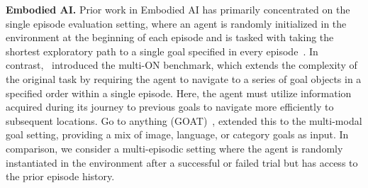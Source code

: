 \textbf{Embodied AI.} 
Prior work in Embodied AI has primarily concentrated on the single episode evaluation setting, where an agent is randomly initialized in the environment at the beginning of each episode and is tasked with taking the shortest exploratory path to a single goal specified in every episode~\citep{wijmans2019dd,yadav2022ovrl}. In contrast,~\cite{wani2020multion} introduced the multi-ON benchmark, which extends the complexity of the original task by requiring the agent to navigate to a series of goal objects in a specified order within a single episode. Here, the agent must utilize information acquired during its journey to previous goals to navigate more efficiently to subsequent locations. Go to anything (GOAT)~\citep{chang2023goat}, extended this to the multi-modal goal setting, providing a mix of image, language, or category goals as input. In comparison, we consider a multi-episodic setting where the agent is randomly instantiated in the environment after a successful or failed trial but has access to the prior episode history.




